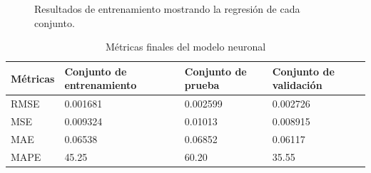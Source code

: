 \documentclass[12pt]{article}
\begin{document}
\begin{figure}[h!]
	\centering
	\captionsetup{justification=centering}
	\caption{Resultados de entrenamiento mostrando la regresión de cada conjunto.}
\end{figure}
\begin{table}[h!]
	\centering
	\caption{Métricas finales del modelo neuronal}
	\begin{tabular}{|l|l|l|l|}
		\hline
		Métricas & Conjunto de entrenamiento & Conjunto de prueba & Conjunto de validación \\ \hline
		RMSE     & 0.001681                  & 0.002599           & 0.002726               \\ \hline
		MSE      & 0.009324                  & 0.01013            & 0.008915               \\ \hline
		MAE      & 0.06538                   & 0.06852            & 0.06117                \\ \hline
		MAPE     & 45.25                     & 60.20              & 35.55                  \\ \hline
	\end{tabular}
\label{red_model_tabla}
\end{table}
\newpage
\end{document}
